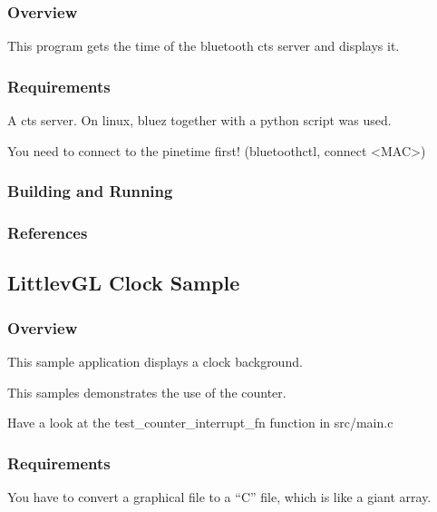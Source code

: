 \documentclass[letterpaper,10pt,english]{sphinxmanual}
\begin{document}
\subsubsection{Overview}
\label{\detokenize{samples/gui/clock-cts/README:overview}}
This program gets the time of the bluetooth cts server and displays it.


\subsubsection{Requirements}
\label{\detokenize{samples/gui/clock-cts/README:requirements}}
A cts server.
On linux, bluez together with a python script was used.

You need to connect to the pinetime first!
(bluetoothctl, connect \textless{}MAC\textgreater{})


\subsubsection{Building and Running}
\label{\detokenize{samples/gui/clock-cts/README:building-and-running}}

\subsubsection{References}
\label{\detokenize{samples/gui/clock-cts/README:references}}

\subsection{LittlevGL Clock Sample}
\label{\detokenize{samples/gui/clock/README:littlevgl-clock-sample}}\label{\detokenize{samples/gui/clock/README:clock-sample}}\label{\detokenize{samples/gui/clock/README::doc}}

\subsubsection{Overview}
\label{\detokenize{samples/gui/clock/README:overview}}
This sample application displays a clock background.

This samples demonstrates the use of the counter.

Have a look at the test\_counter\_interrupt\_fn function in src/main.c


\subsubsection{Requirements}
\label{\detokenize{samples/gui/clock/README:requirements}}
You have to convert a graphical file to a “C” file, which is like a giant array.
\end{document}
